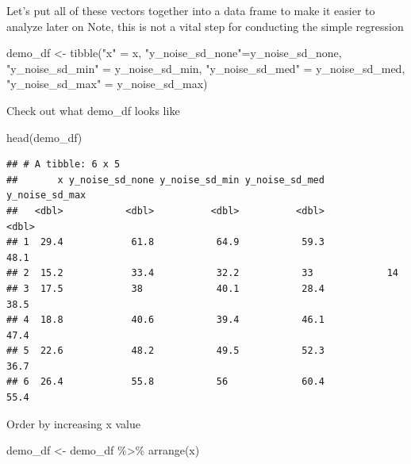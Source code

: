 \documentclass[
]{book}
\newenvironment{Shaded}{\begin{snugshade}}{\end{snugshade}}
\newcommand{\FunctionTok}[1]{\textcolor[rgb]{0.00,0.00,0.00}{#1}}
\newcommand{\NormalTok}[1]{#1}
\newcommand{\OtherTok}[1]{\textcolor[rgb]{0.56,0.35,0.01}{#1}}
\newcommand{\SpecialCharTok}[1]{\textcolor[rgb]{0.00,0.00,0.00}{#1}}
\newcommand{\StringTok}[1]{\textcolor[rgb]{0.31,0.60,0.02}{#1}}
\begin{document}
Let's put all of these vectors together into a data frame to make it easier to analyze later on
Note, this is not a vital step for conducting the simple regression

\begin{Shaded}
\begin{Highlighting}[]
\NormalTok{demo\_df }\OtherTok{\textless{}{-}} \FunctionTok{tibble}\NormalTok{(}\StringTok{"x"} \OtherTok{=}\NormalTok{ x, }
                  \StringTok{"y\_noise\_sd\_none"}\OtherTok{=}\NormalTok{y\_noise\_sd\_none, }
                  \StringTok{"y\_noise\_sd\_min"} \OtherTok{=}\NormalTok{ y\_noise\_sd\_min,}
                  \StringTok{"y\_noise\_sd\_med"} \OtherTok{=}\NormalTok{ y\_noise\_sd\_med,}
                  \StringTok{"y\_noise\_sd\_max"} \OtherTok{=}\NormalTok{ y\_noise\_sd\_max)}
\end{Highlighting}
\end{Shaded}

Check out what demo\_df looks like

\begin{Shaded}
\begin{Highlighting}[]
\FunctionTok{head}\NormalTok{(demo\_df)}
\end{Highlighting}
\end{Shaded}

\begin{verbatim}
## # A tibble: 6 x 5
##       x y_noise_sd_none y_noise_sd_min y_noise_sd_med y_noise_sd_max
##   <dbl>           <dbl>          <dbl>          <dbl>          <dbl>
## 1  29.4            61.8           64.9           59.3           48.1
## 2  15.2            33.4           32.2           33             14  
## 3  17.5            38             40.1           28.4           38.5
## 4  18.8            40.6           39.4           46.1           47.4
## 5  22.6            48.2           49.5           52.3           36.7
## 6  26.4            55.8           56             60.4           55.4
\end{verbatim}

Order by increasing x value

\begin{Shaded}
\begin{Highlighting}[]
\NormalTok{demo\_df }\OtherTok{\textless{}{-}}\NormalTok{ demo\_df }\SpecialCharTok{\%\textgreater{}\%} 
  \FunctionTok{arrange}\NormalTok{(x)}
\end{Highlighting}
\end{Shaded}
\end{document}

